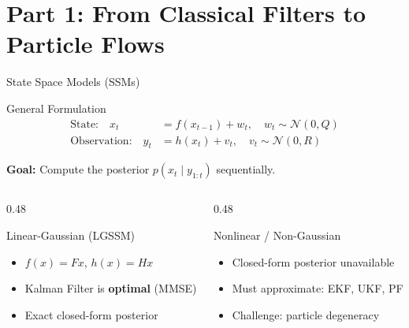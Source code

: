 \documentclass[aspectratio=169,10pt]{beamer}
\newcommand{\N}{\mathcal{N}}
\newcommand{\highlight}[1]{\textcolor{jpmlightblue}{\textbf{#1}}}
\begin{document}
\section{Part 1: From Classical Filters to Particle Flows}

\begin{frame}{State Space Models (SSMs)}
\begin{block}{General Formulation}
\vspace{-0.5em}
\begin{align}
  \text{State:} \quad x_t &= f(x_{t-1}) + w_t, \quad w_t \sim \N(0, Q) \\
  \text{Observation:} \quad y_t &= h(x_t) + v_t, \quad v_t \sim \N(0, R)
\end{align}
\end{block}

\textbf{Goal:} Compute the posterior $p(x_t \mid y_{1:t})$ sequentially.

\vspace{0.5em}
\begin{columns}[T]
\begin{column}{0.48\textwidth}
\begin{exampleblock}{Linear-Gaussian (LGSSM)}
\begin{itemize}
  \item $f(x) = Fx$, $h(x) = Hx$
  \item Kalman Filter is \highlight{optimal} (MMSE)
  \item Exact closed-form posterior
\end{itemize}
\end{exampleblock}
\end{column}
\begin{column}{0.48\textwidth}
\begin{alertblock}{Nonlinear / Non-Gaussian}
\begin{itemize}
  \item Closed-form posterior unavailable
  \item Must approximate: EKF, UKF, PF
  \item Challenge: particle degeneracy
\end{itemize}
\end{alertblock}
\end{column}
\end{columns}
\end{frame}
\end{document}
